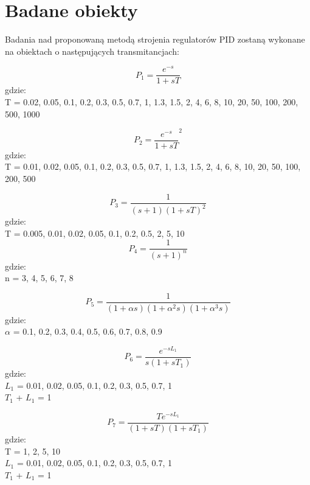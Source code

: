 \documentclass[10pt,a4paper]{article}
\begin{document}
\section{Badane obiekty}

Badania nad proponowaną metodą strojenia regulatorów PID zostaną wykonane na obiektach o następujących transmitancjach:

\begin{equation}
P_1 = \frac{e^{-s}}{1 + sT}
\end{equation}
gdzie:\\
T = 0.02, 0.05, 0.1, 0.2, 0.3, 0.5, 0.7, 1, 1.3, 1.5, 2, 4, 6, 8, 10, 20, 50, 100, 200, 500, 1000

\begin{equation}
P_2 = \frac{e^{-s}}{1 + sT}^2
\end{equation}
gdzie:\\
T = 0.01, 0.02, 0.05, 0.1, 0.2, 0.3, 0.5, 0.7, 1, 1.3, 1.5, 2, 4, 6, 8, 10, 20, 50, 100, 200, 500

\begin{equation}
P_3 = \frac{1}{(s + 1)(1 + sT)^2}
\end{equation}
gdzie:\\
T = 0.005, 0.01, 0.02, 0.05, 0.1, 0.2, 0.5, 2, 5, 10
\begin{equation}
P_4 = \frac{1}{{(s + 1)}^n}
\end{equation}
gdzie:\\
n = 3, 4, 5, 6, 7, 8

\begin{equation}
P_5 = \frac{1}{(1 + \alpha s)(1 + \alpha^2 s)(1 + \alpha^3 s)}
\end{equation}
gdzie:\\
$\alpha$ = 0.1, 0.2, 0.3, 0.4, 0.5, 0.6, 0.7, 0.8, 0.9

\begin{equation}
P_6 = \frac{e^{-sL_1}}{s(1 + sT_1)}
\end{equation}
gdzie:\\
$L_1$ = 0.01, 0.02, 0.05, 0.1, 0.2, 0.3, 0.5, 0.7, 1\\ 
$T_1$ + $L_1$ = 1	    

\begin{equation}
P_7 = \frac{Te^{-sL_1}}{(1 + sT)(1 + sT_1)}
\end{equation}
gdzie:\\
T = 1, 2, 5, 10\\
$L_1$ = 0.01, 0.02, 0.05, 0.1, 0.2, 0.3, 0.5, 0.7, 1\\
$T_1$ + $L_1$ = 1
\end{document}
